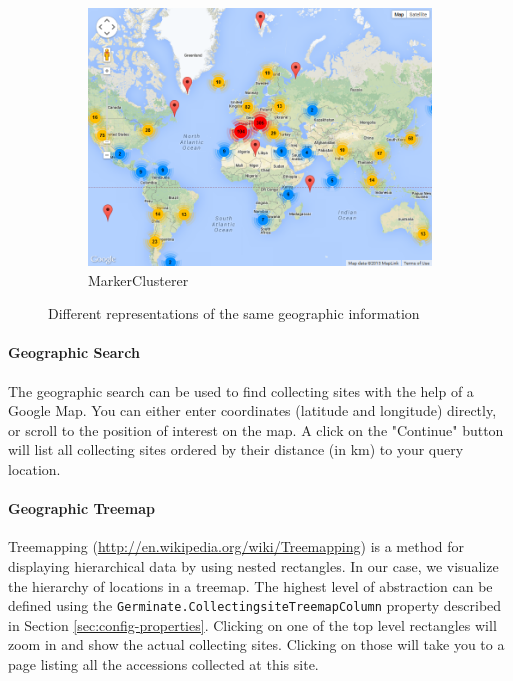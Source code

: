 \begin{figure}
\begin{subfigure}[t]{0.32\textwidth}
        \includegraphics[width=\textwidth]{img/features/markerclusterer.png}
        \caption{MarkerClusterer}
    \end{subfigure}
    \caption{Different representations of the same geographic information}
    \label{fig:geography-maps}
\end{figure}

\paragraph{Geographic Search}
The geographic search can be used to find collecting sites with the help of a Google Map. You can either enter coordinates (latitude and longitude) directly, or scroll to the position of interest on the map. A click on the "Continue" button will list all collecting sites ordered by their distance (in km) to your query location.

\paragraph{Geographic Treemap}
Treemapping (\url{http://en.wikipedia.org/wiki/Treemapping}) is a method for displaying hierarchical data by using nested rectangles. In our case, we visualize the hierarchy of locations in a treemap. The highest level of abstraction can be defined using the \texttt{Germinate\allowbreak .CollectingsiteTreemapColumn} property described in Section \ref{sec:config-properties}. Clicking on one of the top level rectangles will zoom in and show the actual collecting sites. Clicking on those will take you to a page listing all the accessions collected at this site.

